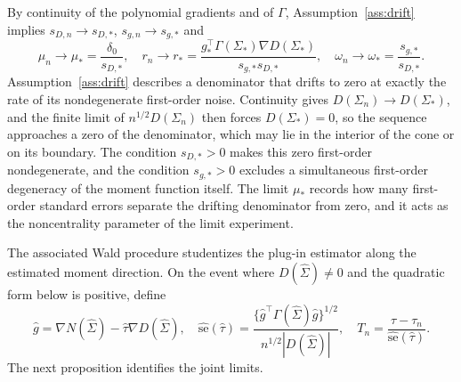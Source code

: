 \documentclass[12pt,a4paper]{article}
\theoremstyle{plain}
\theoremstyle{definition}
\newcommand{\Sighat}{\hat{\Sigma}}
\begin{document}
By continuity of the polynomial gradients and of $\Gamma$, Assumption~\ref{ass:drift} implies $s_{D,n}\to s_{D,\ast}$, $s_{g,n}\to s_{g,\ast}$ and
\begin{equation*}
    \mu_n\to \mu_{\ast}
    =
    \frac{\delta_0}{s_{D,\ast}}
    ,\quad
    r_n\to r_\ast
    =
    \frac{g_\ast^\top\Gamma(\Sigma_\ast)\nabla D(\Sigma_\ast)}{s_{g,\ast}s_{D,\ast}}
    ,\quad
    \omega_n\to\omega_\ast=\frac{s_{g,\ast}}{s_{D,\ast}}
    .
\end{equation*}
Assumption~\ref{ass:drift} describes a denominator that drifts to zero at exactly the rate of its nondegenerate first-order noise.
Continuity gives $D(\Sigma_n)\to D(\Sigma_\ast)$, and the finite limit of $n^{1/2}D(\Sigma_n)$ then forces $D(\Sigma_\ast)=0$, so the sequence approaches a zero of the denominator, which may lie in the interior of the cone or on its boundary.
The condition $s_{D,\ast}>0$ makes this zero first-order nondegenerate, and the condition $s_{g,\ast}>0$ excludes a simultaneous first-order degeneracy of the moment function itself.
The limit $\mu_\ast$ records how many first-order standard errors separate the drifting denominator from zero, and it acts as the noncentrality parameter of the limit experiment.

The associated Wald procedure studentizes the plug-in estimator along the estimated moment direction.
On the event where $D(\Sighat)\ne 0$ and the quadratic form below is positive, define
\begin{equation}
\label{eq:wald-studentizer}
    \hat{g}
    =
    \nabla N(\Sighat)-\hat{\tau}\nabla D(\Sighat)
    ,\quad
    \widehat{\mathrm{se}}(\hat\tau)
    =
    \frac{\{\hat{g}^\top\Gamma(\Sighat)\hat{g}\}^{1/2}}
    {n^{1/2}|D(\Sighat)|}
    ,\quad
    T_n
    =
    \frac{\hat{\tau}-\tau_n}{\widehat{\mathrm{se}}(\hat{\tau})}
    .
\end{equation}
The next proposition identifies the joint limits.
\end{document}
